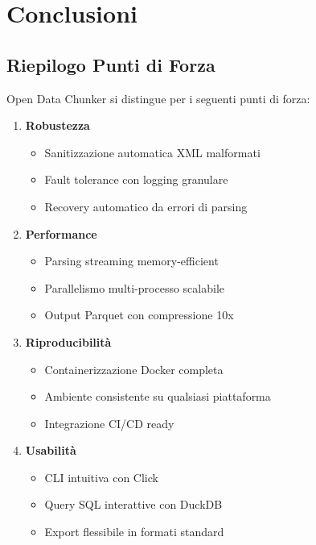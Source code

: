 \chapter{Conclusioni}

\section{Riepilogo Punti di Forza}

Open Data Chunker si distingue per i seguenti punti di forza:

\begin{enumerate}
    \item \textbf{Robustezza}
    \begin{itemize}
        \item Sanitizzazione automatica XML malformati
        \item Fault tolerance con logging granulare
        \item Recovery automatico da errori di parsing
    \end{itemize}
    
    \item \textbf{Performance}
    \begin{itemize}
        \item Parsing streaming memory-efficient
        \item Parallelismo multi-processo scalabile
        \item Output Parquet con compressione 10x
    \end{itemize}
    
    \item \textbf{Riproducibilità}
    \begin{itemize}
        \item Containerizzazione Docker completa
        \item Ambiente consistente su qualsiasi piattaforma
        \item Integrazione CI/CD ready
    \end{itemize}
    
    \item \textbf{Usabilità}
    \begin{itemize}
        \item CLI intuitiva con Click
        \item Query SQL interattive con DuckDB
        \item Export flessibile in formati standard
    \end{itemize}
\end{enumerate}

